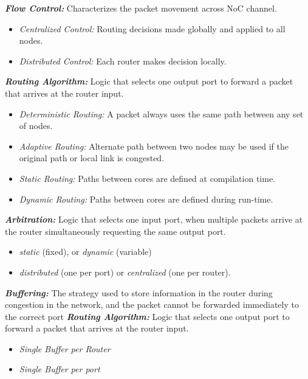 \begin{frame}
    \textbf{\textit{Flow Control:}} Characterizes the packet movement across NoC channel.
      \begin {itemize}
	  \item \textit {Centralized Control:} Routing decisions made globally and applied to all nodes.
	  \item \textit {Distributed Control:} Each router makes decision locally. 
      \end {itemize}
    
    \textbf{\textit{Routing Algorithm:}} Logic that selects one output port to forward a packet 
		  that arrives at the router input.
      \begin {itemize}
	  \item \textit {Deterministic Routing:} A packet always uses the same path
				    between any set of nodes.
	  \item \textit {Adaptive Routing:} Alternate path between two nodes may be
				    used if the original path or local link is congested. 
	  \item \textit {Static Routing:} Paths between cores are defined at compilation time.
	  \item \textit {Dynamic Routing:} Paths between cores are defined during run-time.
      \end {itemize}
    
\end{frame}


\begin{frame}
    \textbf{\textit{Arbitration:}} Logic that selects one input port, 
    when multiple packets arrive at the router simultaneously requesting the same output port.
      \begin {itemize}
	  \item \textit{static} (fixed), or \textit{dynamic} (variable)
	  \item \textit{distributed} (one per port) or \textit{centralized} (one per router). 
      \end {itemize}
    
    \textbf{\textit{Buffering:}}
	  The strategy used to store information in the router during
	  congestion in the network, and the packet cannot be forwarded 
	  immediately to the correct port
    \textbf{\textit{Routing Algorithm:}} Logic that selects one output port to forward a packet 
		  that arrives at the router input.
      \begin {itemize}
	  \item \textit {Single Buffer per Router} %
	  \item \textit {Single Buffer per port}
      \end {itemize}
    
\end{frame}


